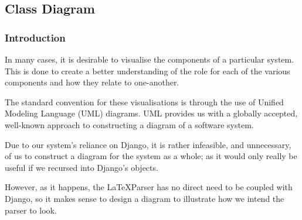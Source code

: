 \subsection{Class Diagram}
	\subsubsection{Introduction}
		In many cases, it is desirable to visualise the components of a particular system. This is done to create a better understanding of the role for each of the various components and how they relate to one-another.
		
		The standard convention for these visualisations is through the use of Unified Modeling Language (UML) diagrams. UML provides us with a globally accepted, well-known approach to constructing a diagram of a software system. 
		
		Due to our system's reliance on Django, it is rather infeasible, and unnecessary, of us to construct a diagram for the system as a whole; as it would only really be useful if we recursed into Django's objects.
		
		However, as it happens, the \LaTeX Parser has no direct need to be coupled with Django, so it makes sense to design a diagram to illustrate how we intend the parser to look.
		
		